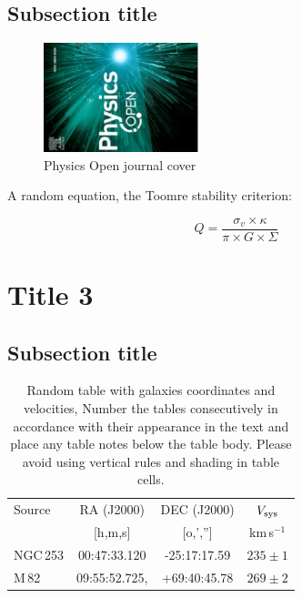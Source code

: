 \documentclass[final,5p,times,twocolumn,authoryear]{elsarticle}
\newcommand{\kms}{km\,s$^{-1}$}
\begin{document}
\subsection{Subsection title}

\begin{figure}
	\centering 
	\includegraphics[width=0.4\textwidth, angle=-90]{PHYSO_cover_image.pdf}	
	\caption{Physics Open journal cover} 
	\label{fig_mom0}%
\end{figure}

A random equation, the Toomre stability criterion:

\begin{equation}
    Q = \frac{\sigma_v \times \kappa}{\pi \times G \times \Sigma}
\end{equation}

\section{Title 3}
\lipsum[2]

\subsection{Subsection title}
\lipsum[3]

\begin{table}
\begin{tabular}{l c c c} 
 \hline
 Source & RA (J2000) & DEC (J2000) & $V_{\rm sys}$ \\ 
        & [h,m,s]    & [o,','']    & \kms          \\
 \hline
 NGC\,253 & 	00:47:33.120 & -25:17:17.59 & $235 \pm 1$ \\ 
 M\,82 & 09:55:52.725, & +69:40:45.78 & $269 \pm 2$ 	 \\ 
 \hline
\end{tabular}
\caption{Random table with galaxies coordinates and velocities, Number the tables consecutively in
accordance with their appearance in the text and place any table notes below the table body. Please avoid using vertical rules and shading in table cells.
}
\label{Table1}
\end{table}
\end{document}
